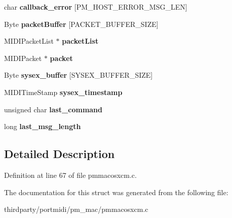 \begin{DoxyCompactItemize}
\item 
\mbox{\label{structmidi__macosxcm__struct_aafbd8d732bba6ec5ca7b95ac4965f60f}} 
char {\bfseries callback\+\_\+error} \mbox{[}P\+M\+\_\+\+H\+O\+S\+T\+\_\+\+E\+R\+R\+O\+R\+\_\+\+M\+S\+G\+\_\+\+L\+EN\mbox{]}
\item 
\mbox{\label{structmidi__macosxcm__struct_a0f23c8779a1b2890e657bfaf0dfcc462}} 
Byte {\bfseries packet\+Buffer} \mbox{[}P\+A\+C\+K\+E\+T\+\_\+\+B\+U\+F\+F\+E\+R\+\_\+\+S\+I\+ZE\mbox{]}
\item 
\mbox{\label{structmidi__macosxcm__struct_ac5176780d36fd79cf257c95f5e51a40e}} 
M\+I\+D\+I\+Packet\+List $\ast$ {\bfseries packet\+List}
\item 
\mbox{\label{structmidi__macosxcm__struct_afaacc33d2072c0c58e110487f2d9442f}} 
M\+I\+D\+I\+Packet $\ast$ {\bfseries packet}
\item 
\mbox{\label{structmidi__macosxcm__struct_a6fef1633a59357667e31d355a7a14939}} 
Byte {\bfseries sysex\+\_\+buffer} \mbox{[}S\+Y\+S\+E\+X\+\_\+\+B\+U\+F\+F\+E\+R\+\_\+\+S\+I\+ZE\mbox{]}
\item 
\mbox{\label{structmidi__macosxcm__struct_a2b40358acace8116d0a90afd4d783315}} 
M\+I\+D\+I\+Time\+Stamp {\bfseries sysex\+\_\+timestamp}
\item 
\mbox{\label{structmidi__macosxcm__struct_a3b158048a015bcd9c381f5c2a46e56d2}} 
unsigned char {\bfseries last\+\_\+command}
\item 
\mbox{\label{structmidi__macosxcm__struct_ae75712a74bb29e9d72b01a0435cea2fc}} 
long {\bfseries last\+\_\+msg\+\_\+length}
\end{DoxyCompactItemize}


\subsection{Detailed Description}


Definition at line 67 of file pmmacosxcm.\+c.



The documentation for this struct was generated from the following file\+:\begin{DoxyCompactItemize}
\item 
thirdparty/portmidi/pm\+\_\+mac/pmmacosxcm.\+c\end{DoxyCompactItemize}
